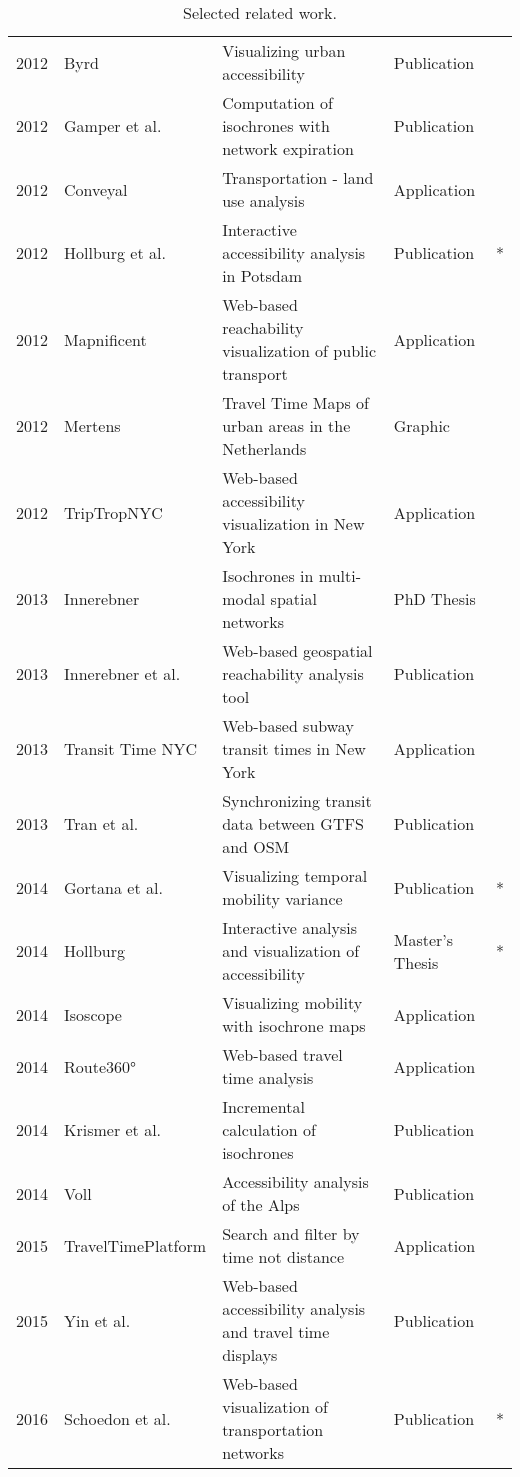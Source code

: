 \begin{table}[htb]
\begin{tabular}{r|l|l|l|c}
      2012 & Byrd \cite{Byrd2012} & Visualizing urban accessibility  & Publication  & \\
      2012 & Gamper et al. \cite{gamper2012scalable} & Computation of isochrones with network expiration  & Publication  & \\
      2012 & Conveyal \cite{Conveyal} & Transportation - land use analysis  & Application  & \\
      2012 & Hollburg et al. \cite{hollburghier} & Interactive accessibility analysis in Potsdam & Publication  & * \\
      2012 & Mapnificent \cite{Mapnificent}  & Web-based reachability visualization of public transport  & Application  & \\
      2012 & Mertens \cite{meertens2012} & Travel Time Maps of urban areas in the Netherlands  & Graphic  & \\
      2012 & TripTropNYC \cite{TriptropNYC} & Web-based accessibility visualization in New York  & Application  & \\
      2013 & Innerebner \cite{Innerebner2013} & Isochrones in multi-modal spatial networks  & PhD Thesis  & \\
      2013 & Innerebner et al. \cite{innerebner2013isoga} & Web-based geospatial reachability analysis tool  & Publication  & \\
      2013 & Transit Time NYC \cite{TransitTimeNYC} & Web-based subway transit times in New York & Application & \\
      2013 & Tran et al. \cite{tran2013go_sync} & Synchronizing transit data between GTFS and OSM  & Publication  & \\
      2014 & Gortana et al. \cite{gortanaisoscope} & Visualizing temporal mobility variance  & Publication  & * \\
      2014 & Hollburg \cite{Hollburg2014} & Interactive analysis and visualization of accessibility & Master's Thesis  & * \\
      2014 & Isoscope \cite{Isoscope} & Visualizing mobility with isochrone maps  & Application  & \\
      2014 & Route360° \cite{Route360} & Web-based travel time analysis  & Application  & \\
      2014 & Krismer et al. \cite{krismer2014incremental} & Incremental calculation of isochrones  & Publication  & \\
      2014 & Voll \cite{vollerreichbarkeiten} & Accessibility analysis of the Alps  & Publication  & \\
      2015 & TravelTimePlatform \cite{TravelTimePlatform} & Search and filter by time not distance  & Application  & \\
      2015 & Yin et al. \cite{yin2015understanding} & Web-based accessibility analysis and travel time displays  & Publication  & \\
      2016 & Schoedon et al. \cite{STHD2016} & Web-based visualization of transportation networks  & Publication  & * \\
    \end{tabular}
    \caption{Selected related work.}
    \label{tab:overv:relat}
  \end{table}


